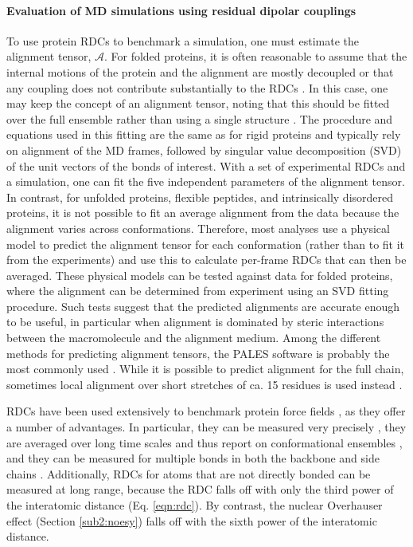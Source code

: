 \documentclass[9pt,review,pubversion]{livecoms}
\begin{document}
\paragraph{Evaluation of MD simulations using residual dipolar couplings}

To use protein RDCs to benchmark a simulation, one must estimate the alignment tensor, $\mathcal{A}$.
For folded proteins, it is often reasonable to assume that the internal motions of the protein and the alignment are mostly decoupled or that any coupling does not contribute substantially to the RDCs \cite{louhivuori2006conformational,salvatella2008influence}.
In this case, one may keep the concept of an alignment tensor, noting that this should be fitted over the full ensemble rather than using a single structure \cite{lindorff2005simultaneous,showalter2007quantitative}.
The procedure and equations used in this fitting are the same as for rigid proteins and typically rely on alignment of the MD frames, followed by singular value decomposition (SVD) of the unit vectors of the bonds of interest.
With a set of experimental RDCs and a simulation, one can fit the five independent parameters of the alignment tensor.
In contrast, for unfolded proteins, flexible peptides, and intrinsically disordered proteins, it is not possible to fit an average alignment from the data because the alignment varies across conformations.
Therefore, most analyses use a physical model to predict the alignment tensor for each conformation (rather than to fit it from the experiments) and use this to calculate per-frame RDCs that can then be averaged.
These physical models can be tested against data for folded proteins, where the alignment can be determined from experiment using an SVD fitting procedure.
Such tests suggest that the predicted alignments are accurate enough to be useful, in particular when alignment is dominated by steric interactions between the macromolecule and the alignment medium.
Among the different methods for predicting alignment tensors, the PALES software is probably the most commonly used \cite{zweckstetter_nmr_2008}.
While it is possible to predict alignment for the full chain, sometimes local alignment over short stretches of ca. 15 residues is used instead \cite{marsh2008calculation}.

RDCs have been used extensively to benchmark protein force fields \cite{lange2010scrutinizing,lindorff-larsen_improved_2010,lindorff2012systematic,robustelli_developing_2018}, as they offer a number of advantages.
In particular, they can be measured very precisely \cite{chiliveri2021advances}, they are averaged over long time scales and thus report on conformational ensembles \cite{lakomek2008self}, and they can be measured for multiple bonds in both the backbone and side chains \cite{chiliveri2021advances}.
Additionally, RDCs for atoms that are not directly bonded can be measured at long range, because the RDC falls off with only the third power of the interatomic distance (Eq. \ref{eqn:rdc}).
By contrast, the nuclear Overhauser effect (Section \ref{sub2:noesy}) falls off with the sixth power of the interatomic distance.
\end{document}

